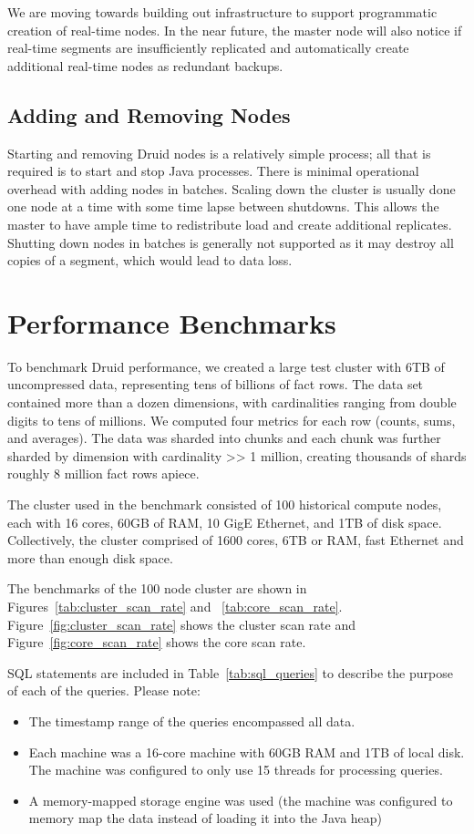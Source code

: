 \documentclass{vldb}
\begin{document}
We are moving towards building out infrastructure to support
programmatic creation of real-time nodes. In the near future, the
master node will also notice if real-time segments are insufficiently
replicated and automatically create additional real-time nodes as
redundant backups.

\subsection{Adding and Removing Nodes}
Starting and removing Druid nodes is a relatively simple process; all
that is required is to start and stop Java processes. There is minimal
operational overhead with adding nodes in batches. Scaling down the
cluster is usually done one node at a time with some time lapse
between shutdowns. This allows the master to have ample time to
redistribute load and create additional replicates. Shutting down
nodes in batches is generally not supported as it may destroy all
copies of a segment, which would lead to data loss.

\section{Performance Benchmarks}
\label{sec:benchmarks}
To benchmark Druid performance, we created a large test cluster with
6TB of uncompressed data, representing tens of billions of fact
rows. The data set contained more than a dozen dimensions, with
cardinalities ranging from double digits to tens of millions. We computed
four metrics for each row (counts, sums, and averages). The data was
sharded into chunks and each chunk was further sharded by dimension
with cardinality >> 1 million, creating thousands of shards roughly 8
million fact rows apiece.

The cluster used in the benchmark consisted of 100 historical compute
nodes, each with 16 cores, 60GB of RAM, 10 GigE Ethernet, and 1TB of
disk space. Collectively, the cluster comprised of 1600 cores, 6TB or
RAM, fast Ethernet and more than enough disk space.

The benchmarks of the 100 node cluster
are shown in Figures~\ref{tab:cluster_scan_rate} and ~\ref{tab:core_scan_rate}.
Figure~\ref{fig:cluster_scan_rate} shows the cluster scan rate and Figure~\ref{fig:core_scan_rate} shows the core scan rate.

SQL statements are included in Table~\ref{tab:sql_queries} to describe the
purpose of each of the queries. Please note:
\begin{itemize}
\item The timestamp range of the queries encompassed all data.
\item Each machine was a 16-core machine with 60GB RAM and 1TB of local
  disk. The machine was configured to only use 15 threads for
  processing queries.
\item A memory-mapped storage engine was used (the machine was configured to memory map the data
  instead of loading it into the Java heap)
\end{itemize}
\end{document}
